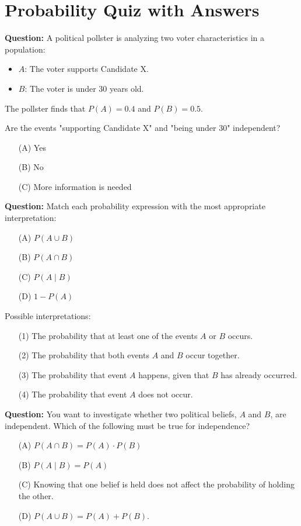 \documentclass[12pt]{article}
\begin{document}
\section*{Probability Quiz with Answers}

\textbf{Question:}  
A political pollster is analyzing two voter characteristics in a population:  
\begin{itemize}
    \item \( A \): The voter supports Candidate X.  
    \item \( B \): The voter is under 30 years old.  
\end{itemize}
The pollster finds that \( P(A) = 0.4 \) and \( P(B) = 0.5 \).  

Are the events "supporting Candidate X" and "being under 30" independent?
\begin{enumerate}
    \item[(A)] Yes 
    \item[(B)] No
    \item[(C)] More information is needed
\end{enumerate}

\textbf{Question:}  
Match each probability expression with the most appropriate interpretation:  
\begin{enumerate}
    \item[(A)] \( P(A \cup B) \)  
    \item[(B)] \( P(A \cap B) \)  
    \item[(C)] \( P(A \mid B) \)  
    \item[(D)] \( 1 - P(A) \)  
\end{enumerate}

Possible interpretations:  

\begin{enumerate}
    \item[(1)] The probability that at least one of the events \( A \) or \( B \) occurs.  
    \item[(2)] The probability that both events \( A \) and \( B \) occur together.  
    \item[(3)] The probability that event \( A \) happens, given that \( B \) has already occurred.  
    \item[(4)] The probability that event \( A \) does not occur.  
\end{enumerate}

\textbf{Question:}  
You want to investigate whether two political beliefs, \( A \) and \( B \), are independent. Which of the following must be true for independence?  
\begin{enumerate}
    \item[(A)] \( P(A \cap B) = P(A) \cdot P(B) \)  
    \item[(B)] \( P(A \mid B) = P(A) \)  
    \item[(C)] Knowing that one belief is held does not affect the probability of holding the other.  
    \item[(D)] \( P(A \cup B) = P(A) + P(B)\).  
\end{enumerate}
\end{document}
